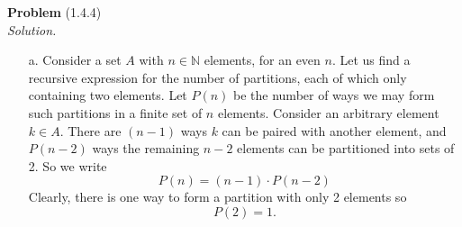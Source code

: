 \documentclass[12 pt]{amsart}
\begin{document}
\clearpage
\phantom{\quad} \vfill
\noindent
\textbf{Problem} (1.4.4) \\[4ex]
\emph{Solution.} \\[2ex]
	\begin{enumerate}
		\item[a.]
      Consider a set $A$ with $n \in \mathbb{N}$ elements, for an even $n$. 
      Let us find a recursive expression for the number of partitions, each
      of which only containing two elements. 
      Let $P(n)$ be the number of ways we may form such partitions in a 
      finite set of $n$ elements. 
      Consider an arbitrary element $k \in A$.
      There are $(n-1)$ ways $k$ can be paired with another element, 
      and $P(n-2)$ ways the remaining $n-2$ elements can be partitioned
      into sets of 2.
      So we write
      \[
        P(n) = (n-1)\cdot P(n-2)
      \]
      Clearly, there is one way to form a partition with only 2 elements
      so 
      \[
        P(2) = 1.
      \]
      

\end{enumerate}
\end{document}
